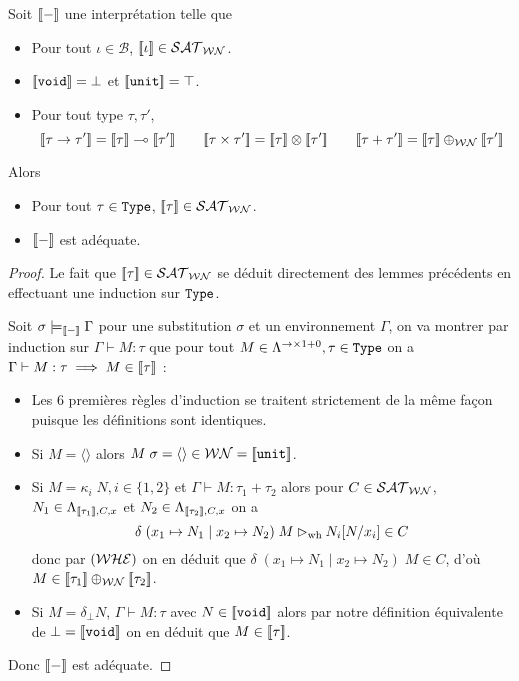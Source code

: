 \begin{them}
    Soit $[\![ - ]\!]$ une interprétation telle que
    \begin{itemize}[label=$\bullet$]
        \item Pour tout $\iota\in\mathcal B$, $[\![ \iota ]\!] \in\mathcal {SAT}_{\mathcal{WN}}$.
        \item $[\![ \texttt{void} ]\!] = \bot$ et $[\![ \texttt{unit} ]\!] = \top$.
        \item Pour tout type $\tau,\tau'$, $$\trad{\tau\to\tau'} = \trad\tau\oto\trad{\tau'}\qquad \trad{\tau\times\tau'} = \trad\tau\otimes\trad{\tau'}\qquad \trad{\tau +\tau'} = \trad\tau\oplus_\WN \trad{\tau'}$$
    \end{itemize}
    Alors 
    \begin{itemize}[label=$\bullet$]
        \item Pour tout $\tau\in\texttt{Type}$, $[\![ \tau ]\!]\in\mathcal {SAT}_{\mathcal{WN}}$.
        \item $[\![ - ]\!]$ est adéquate.
    \end{itemize}
\end{them}

\begin{proof}
    Le fait que $[\![ \tau ]\!]\in\mathcal {SAT}_{\mathcal{WN}}$ se déduit directement des lemmes précédents en effectuant une induction sur $\texttt{Type}$.

    Soit $\sigma\models_{[\![ - ]\!]} \Gamma$ pour une substitution $\sigma$ et un environnement $\Gamma$, on va montrer par induction sur $\Gamma\vdash M : \tau$ que pour tout $M\in\Lambda^{\to\times 1+0}, \tau\in\texttt{Type}$ on a $\Gamma\vdash M : \tau \implies M \in[\![ \tau ]\!]$ :
    \begin{itemize}[label=$\bullet$]
        \item Les $6$ premières règles d'induction se traitent strictement de la même façon puisque les définitions sont identiques.
        \item Si $M = \langle\rangle$ alors $M\;\sigma = \langle\rangle\in\mathcal {WN} = [\![ \texttt{unit} ]\!]$.
        \item Si $M = \kappa_i\;N, i\in\{1,2\}$ et $\Gamma\vdash M : \tau_1+\tau_2$ alors pour $C\in\mathcal {SAT}_{\mathcal{WN}}$, $N_1\in\Lambda_{[\![ \tau_1 ]\!],C,x}$ et $N_2\in\Lambda_{[\![ \tau_2 ]\!],C,x}$ on a $$\delta\;(x_1\mapsto N_1\mid x_2\mapsto N_2)\;M\rhd_{\mathrm{wh}} N_i[N/x_i]\in C$$ donc par $(\mathcal {WHE})$ on en déduit que $\delta\;(x_1\mapsto N_1\mid x_2\mapsto N_2)\;M\in C$, d'où $M\in [\![ \tau_1 ]\!]\oplus_\mathcal {WN} [\![ \tau_2 ]\!]$.
        \item Si $M = \delta_\bot N$, $\Gamma\vdash M : \tau$ avec $N\in[\![ \texttt{void} ]\!]$ alors par notre définition équivalente de $\bot = [\![ \texttt{void} ]\!]$ on en déduit que $M\in [\![ \tau ]\!]$.
    \end{itemize}
    Donc $[\![ - ]\!]$ est adéquate.
\end{proof}


